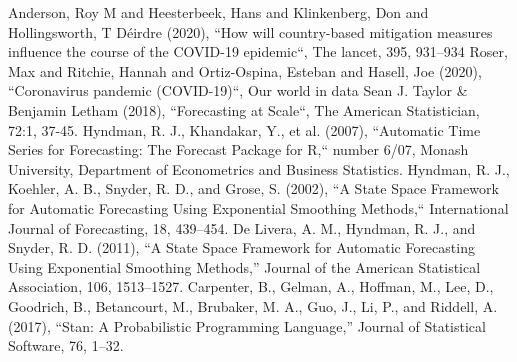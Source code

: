 \documentclass[conference]{IEEEtran}
\begin{document}
\begin{thebibliography}{00}
 Anderson, Roy M and Heesterbeek, Hans and Klinkenberg, Don and Hollingsworth, T D{\'e}irdre (2020), ``How will country-based mitigation measures influence the course of the COVID-19 epidemic``, The lancet, 395, 931--934
 Roser, Max and Ritchie, Hannah and Ortiz-Ospina, Esteban and Hasell, Joe (2020), ``Coronavirus pandemic (COVID-19)``, Our world in data
 Sean J. Taylor \& Benjamin Letham (2018), ``Forecasting at Scale``, The American Statistician, 72:1, 37-45.
 Hyndman, R. J., Khandakar, Y., et al. (2007), ``Automatic Time Series for Forecasting: The Forecast Package for R,`` number 6/07, Monash University, Department of Econometrics and Business Statistics.
 Hyndman, R. J., Koehler, A. B., Snyder, R. D., and Grose, S. (2002), ``A State Space Framework for Automatic Forecasting Using Exponential Smoothing Methods,`` International Journal of Forecasting, 18, 439–454.
 De Livera, A. M., Hyndman, R. J., and Snyder, R. D. (2011), “A State Space
Framework for Automatic Forecasting Using Exponential Smoothing Methods,” Journal of the American Statistical Association, 106, 1513–1527.
 Carpenter, B., Gelman, A., Hoffman, M., Lee, D., Goodrich, B., Betancourt, M., Brubaker, M. A., Guo, J., Li, P., and Riddell, A. (2017), “Stan: A Probabilistic Programming Language,” Journal of Statistical Software, 76, 1–32.
\end{thebibliography}
\vspace{12pt}
\end{document}
